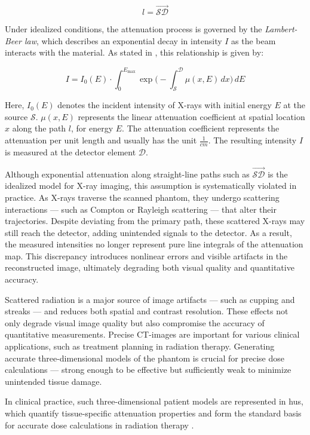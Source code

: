 $$l = \overrightarrow{\mathcal{S}\mathcal{D}}$$

Under idealized conditions, the attenuation process is governed by the
\emph{Lambert-Beer law}, which describes an exponential decay in intensity $I$
as the beam interacts with the material. As stated in
\cite[Chapter 7]{medicalImagingSystemsIntro2019:}, this relationship is given by:

\begin{equation}
    \label{eq:lambert_beer_law}
     I = I_0(E)\cdot \int_0^{E_\text{max}} \exp\bigg(-\int_{{\mathcal{S}}}^{\mathcal{D}} \mu(x,E) \, dx\bigg) \, dE
\end{equation}

Here, $I_0(E)$ denotes the incident intensity of X-rays with initial energy $E$
at the source $\mathcal{S}$. $\mu(x,E)$ represents the linear attenuation
coefficient at spatial location $x$ along the path $l$, for energy $E$. The
attenuation coefficient represents the attenuation per unit length and usually
has the unit $\frac{1}{cm}$. The resulting intensity $I$ is measured at the
detector element $\mathcal{D}$.

Although exponential attenuation along straight-line paths such as
$\overrightarrow{\mathcal{S}\mathcal{D}}$ is the idealized model for X-ray
imaging, this assumption is systematically violated in practice. As X-rays
traverse the scanned phantom, they undergo scattering interactions --- such as
Compton or Rayleigh scattering --- that alter their trajectories. Despite
deviating from the primary path, these scattered X-rays may still reach the
detector, adding unintended signals to the detector. As a result, the measured
intensities no longer represent pure line integrals of the attenuation map. This
discrepancy introduces nonlinear errors and visible artifacts in the
reconstructed image, ultimately degrading both visual quality and quantitative
accuracy.

Scattered radiation is a major source of image artifacts --- such as cupping and
streaks --- and reduces both spatial and contrast resolution. These effects not
only degrade visual image quality but also compromise the accuracy of
quantitative measurements. Precise CT-images are important for various
clinical applications, such as treatment planning in radiation therapy.
Generating accurate three-dimensional models of the phantom is crucial for
precise dose calculations --- strong enough to be effective but sufficiently weak
to minimize unintended tissue damage.

In clinical practice, such three-dimensional patient models are represented in \acfp{hu}, which quantify tissue-specific attenuation properties and form the standard basis for accurate dose calculations in radiation therapy \cite[Chapter~8]{medicalImagingSystemsIntro2019:}.


